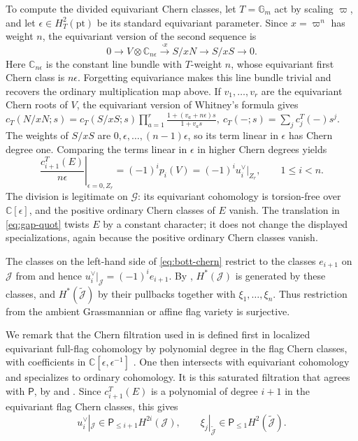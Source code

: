 \documentclass[a4paper,11pt,leqno]{amsart}
\newcommand{\C}{\mathbb C}\newcommand{\J}{\mathcal J}
\newcommand{\tJ}{\widetilde{\mathcal J}}\newcommand{\DR}{DR_n}
\newcommand{\eps}{\epsilon}\newcommand{\dd}{\delta}
\begin{document}
To compute the divided equivariant Chern classes, let
$T=\mathbb G_m$ act by scaling $\varpi$, and let
$\eps\in H_T^2(\mathrm{pt})$ be its standard equivariant parameter.
Since $x=\varpi^n$ has weight $n$, the equivariant version of the
second sequence is
\[
 0\longrightarrow V\otimes\C_{n\eps}\xrightarrow{\cdot x}S/xN
       \longrightarrow S/xS\longrightarrow0.
\]
Here $\C_{n\eps}$ is the constant line bundle with $T$-weight $n$,
whose equivariant first Chern class is $n\eps$. 
Forgetting equivariance makes this line bundle trivial and recovers the ordinary multiplication map above.
If $v_1,\ldots,v_r$ are the equivariant Chern roots of $V$, the equivariant version of Whitney's
formula gives
$
 c_T(N/xN;s)=c_T(S/xS;s)
       \prod_{a=1}^r\frac{1+(v_a+n\eps)s}{1+v_as}, \ c_T(-;s)=\sum_j c_j^T(-)s^j.
$
The weights of $S/xS$ are $0,\eps,\ldots,(n-1)\eps$, so its term
linear in $\eps$ has Chern degree one. Comparing the terms linear
in $\eps$ in higher Chern degrees yields
\begin{equation}\label{eq:bott-chern}
 \left.\frac{c_{i+1}^T(E)}{n\eps}\right|_{\eps=0,Z_r}
   =(-1)^ip_i(V)=(-1)^iu_i^\vee|_{Z_r},\qquad 1\le i<n.
\end{equation}
The division is legitimate on $\mathcal G$: its equivariant cohomology
is torsion-free over $\C[\eps]$, and the positive ordinary Chern
classes of $E$ vanish. 
The translation in \eqref{eq:gap-quot} twists
$E$ by a constant character; it does not change the displayed specializations, again because the positive ordinary Chern classes vanish.

The classes on the left-hand side of \eqref{eq:bott-chern} restrict to the classes
$e_{i+1}$ on $\J$ from \cite{OY17} and hence $u_i^\vee|_\J=(-1)^{i}e_{i+1}$. By \cite[Theorems 1.1.2 and 1.2.1]{OY17},
$H^*(\J)$ is generated by these classes, and $H^*(\tJ)$ by their
pullbacks together with $\xi_1,\ldots,\xi_n$. Thus restriction from
the ambient Grassmannian or affine flag variety is surjective.

We remark that the Chern filtration used in \cite{OY17} is defined first in
localized equivariant full-flag cohomology by polynomial degree in
the flag Chern classes, with coefficients in $\C[\eps,\eps^{-1}]$ \cite[Definitions 8.1.1, 8.2.1]{OY16}.
One then intersects with equivariant cohomology and specializes to
ordinary cohomology. It is this saturated filtration that agrees
with $\mathsf{P}$, by \cite[Proposition 8.5.4]{OY16} and
\cite[Proposition 5.3.1]{OY17}. Since $c_{i+1}^T(E)$ is a polynomial
of degree $i+1$ in the equivariant flag Chern classes, this gives
\begin{equation}\label{eq:chern-bounds}
 u_i^\vee|_{\J}\in \mathsf{P}_{\le i+1}H^{2i}(\J),\qquad
 \xi_j|_{\tJ}\in \mathsf{P}_{\le1}H^2(\tJ).
\end{equation}
\end{document}
